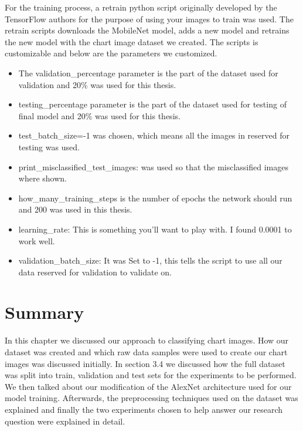 \documentclass[12pt, a4paper,oneside]{report}
\begin{document}
For the training process, a retrain python script originally developed by the TensorFlow authors for the purpose of using your images to train was used. The retrain scripts downloads the MobileNet model, adds a new model and retrains the new model with the chart image dataset we created. The scripts is customizable and below are the parameters we customized.

\begin{itemize}
	
	\item The validation\_percentage parameter is the part of the dataset used for validation and 20\% was used for this thesis.
	
	\item testing\_percentage parameter is the part of the dataset used for testing of final model and 20\% was used for this thesis.
	
	\item test\_batch\_size=-1 was chosen, which means all the images in reserved for testing was used.
	
	\item print\_misclassified\_test\_images:  was used so that the misclassified images where shown.
	
	\item how\_many\_training\_steps is the number of epochs the network should run and 200 was used in this thesis.
	
	\item learning\_rate: This is something you’ll want to play with. I found 0.0001 to work well.
	
	\item validation\_batch\_size: It was Set to -1, this tells the script to use all our data reserved for validation to validate on.
\end{itemize}

\section{Summary}
In this chapter we discussed our approach to classifying chart images. How our dataset was created and which raw data samples were used to create our chart images was discussed initially. In section 3.4 we discussed how the full dataset was split into train, validation and test sets for the experiments to be performed. We then talked about our modification of the AlexNet architecture used for our model training. Afterwards, the preprocessing techniques used on the dataset was explained and finally the two experiments chosen to help answer our research question were explained in detail.
\end{document}
